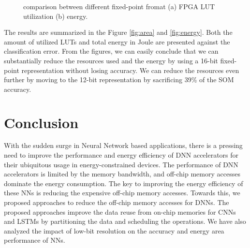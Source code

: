 \documentclass[a4paper,10pt]{article}
\begin{document}
\begin{figure}[!htb]
	\centering
    \captionsetup{font=sf}
	\hfil
	\caption{comparison between different fixed-point fromat (a) FPGA LUT utilization (b) energy.}
	\label{fig:metrics}
\end{figure}

The results are summarized in the Figure \ref{fig:area} and \ref{fig:energy}. Both the amount of utilized LUTs and total energy in Joule are presented against the classification error. From the figures, we can easily conclude that we can substantially reduce the resources used and the energy by using a 16-bit fixed-point representation without losing accuracy. We can reduce the resources even further by moving to the 12-bit representation by sacrificing 39\% of the SOM accuracy. 

\section{Conclusion}
With the sudden surge in Neural Network based applications, there is a pressing need to improve the performance and energy efficiency of DNN accelerators for their ubiquitous usage in energy-constrained devices. The performance of DNN accelerators is limited by the memory bandwidth, and off-chip memory accesses dominate the energy consumption. The key to improving the energy efficiency of these NNs is reducing the expensive off-chip memory accesses. Towards this, we proposed approaches to reduce the off-chip memory accesses for DNNs. The proposed approaches improve the data reuse from on-chip memories for CNNs and LSTMs by partitioning the data and scheduling the operations. We have also analyzed the impact of low-bit resolution on the accuracy and energy area performance of NNs. 

\footnotesize

\end{document}
